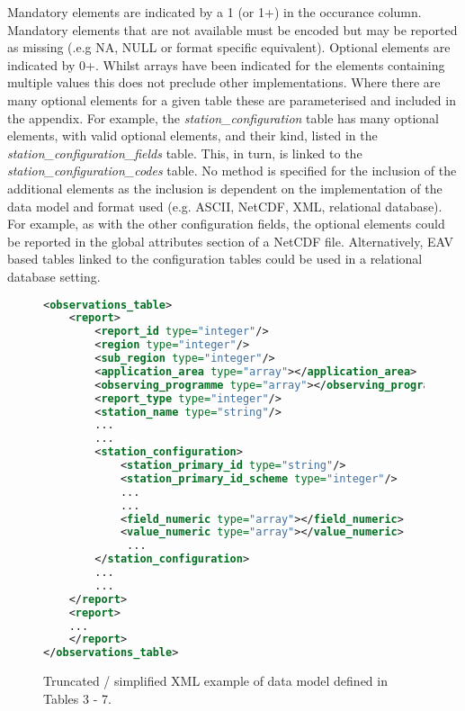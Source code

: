 \documentclass[a4paper]{article}
\newcounter{FramedDepth}
\newenvironment{Framed}{%
  \addtocounter{FramedDepth}{1}
  \ifcase\theFramedDepth\def\FrameColour{white!50}%
    \or\def\FrameColour{white!50}%
    \or\def\FrameColour{white!50}%
    \or\def\FrameColour{white!50}%
    \fi%
  \begin{mdframed}[style=Framed,backgroundcolor=\FrameColour]%
}{\end{mdframed}\addtocounter{FramedDepth}{-1}}
\begin{document}
Mandatory elements are indicated by a 1 (or 1+) in the occurance column. Mandatory elements that are not available must be encoded but may be reported as missing (.e.g NA, NULL or format specific equivalent). Optional elements are indicated by 0+. Whilst arrays have been indicated for the elements containing multiple values this does not preclude other implementations. Where there are many optional elements for a given table these are parameterised and included in the appendix. For example, the \textit{station\_configuration} table has many optional elements, with valid optional elements, and their kind, listed in the \textit{station\_configuration\_fields} table. This, in turn, is linked to the \textit{station\_configuration\_codes} table. No method is specified for the inclusion of the additional elements as the inclusion is dependent on the implementation of the data model and format used (e.g. ASCII, NetCDF, XML, relational database). For example, as with the other configuration fields, the optional elements could be reported in the global attributes section of a NetCDF file. Alternatively, EAV based tables linked to the configuration tables could be used in a relational database setting. 

\begin{figure}
\begin{Framed}
\begin{lstlisting}[language=XML]
<observations_table>
    <report>
        <report_id type="integer"/>
        <region type="integer"/>
        <sub_region type="integer"/>
        <application_area type="array"></application_area>
        <observing_programme type="array"></observing_programme>
        <report_type type="integer"/>
        <station_name type="string"/>
        ...
        ...
        <station_configuration>
            <station_primary_id type="string"/>
            <station_primary_id_scheme type="integer"/>
            ...
            ...
            <field_numeric type="array"></field_numeric>
            <value_numeric type="array"></value_numeric>
             ...
        </station_configuration>
        ...
        ...
    </report>
    <report>
    ...
    </report>
</observations_table>
\end{lstlisting}
\end{Framed}
\caption{Truncated / simplified XML example of data model defined in Tables 3 - 7.}
\end{figure}
\FloatBarrier



\end{document}

